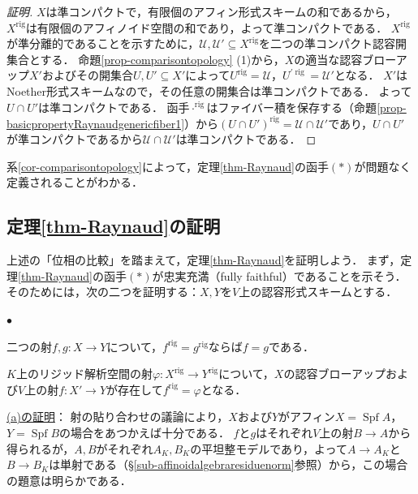 \documentclass[a4paper,12pt, dvipdfmx]{jsbook}
\def\rig{\mathop{\mathrm{rig}}\nolimits}
\def\Spf{\mathop{\mathrm{Spf}}\nolimits}
\renewenvironment{itemize}%
{%
   \begin{list}{\parbox{1zw}{$\bullet$}}%
   {%
      \setlength{\topsep}{.5zh}
      \setlength{\itemindent}{0zw}
      \setlength{\leftmargin}{3zw}%
      \setlength{\rightmargin}{0zw}%
      \setlength{\labelsep}{.5zw}%
      \setlength{\labelwidth}{3zw}%
      \setlength{\itemsep}{0.2em}%
      \setlength{\parsep}{0em}%
      \setlength{\listparindent}{0zw}%
   }
}{%
   \end{list}%
}
\theoremstyle{plain}
\theoremstyle{definition}
\begin{document}
\begin{proof}[証明]
$X$は準コンパクトで，有限個のアフィン形式スキームの和であるから，$X^{\rig}$は有限個のアフィノイド空間の和であり，よって準コンパクトである．
$X^{\rig}$が準分離的であることを示すために，$\mathcal{U},\mathcal{U}'\subseteq X^{\rig}$を二つの準コンパクト認容開集合とする．
命題\ref{prop-comparisontopology} (1)から，$X$の適当な認容ブローアップ$X'$およびその開集合$U,U'\subseteq X'$によって$U^{\rig}=\mathcal{U}$，$U^{\prime\rig}=\mathcal{U}'$となる．
$X'$はNoether形式スキームなので，その任意の開集合は準コンパクトである．
よって$U\cap U'$は準コンパクトである．
函手$\cdot^{\rig}$はファイバー積を保存する（命題\ref{prop-basicpropertyRaynaudgenericfiber1}）から$(U\cap U')^{\rig}=\mathcal{U}\cap\mathcal{U}'$であり，$U\cap U'$が準コンパクトであるから$\mathcal{U}\cap\mathcal{U}'$は準コンパクトである．
\end{proof}

系\ref{cor-comparisontopology}によって，定理\ref{thm-Raynaud}の函手$(\ast)$が問題なく定義されることがわかる．

\subsection{定理\ref{thm-Raynaud}の証明}\label{sub-proofRaynaud}
上述の「位相の比較」を踏まえて，定理\ref{thm-Raynaud}を証明しよう．
まず，定理\ref{thm-Raynaud}の函手$(\ast)$が忠実充満（fully faithful）であることを示そう．
そのためには，次の二つを証明する：$X,Y$を$V$上の認容形式スキームとする．
\begin{itemize}
\item[(a)] 二つの射$f,g\colon X\rightarrow Y$について，$f^{\rig}=g^{\rig}$ならば$f=g$である．
\item[(b)] $K$上のリジッド解析空間の射$\varphi\colon X^{\rig}\rightarrow Y^{\rig}$について，$X$の認容ブローアップおよび$V$上の射$f\colon X'\rightarrow Y$が存在して$f^{\rig}=\varphi$となる．
\end{itemize}

\medskip\noindent
\underline{(a)の証明}：
射の貼り合わせの議論により，$X$および$Y$がアフィン$X=\Spf A$，$Y=\Spf B$の場合をあつかえば十分である．
$f$と$g$はそれぞれ$V$上の射$B\rightarrow A$から得られるが，$A,B$がそれぞれ$A_K,B_K$の平坦整モデルであり，よって$A\rightarrow A_K$と$B\rightarrow B_K$は単射である（\S\ref{sub-affinoidalgebraresiduenorm}参照）から，この場合の題意は明らかである．
\end{document}
